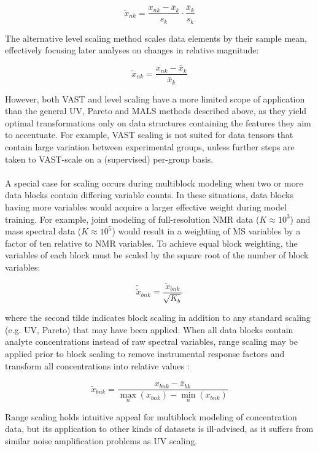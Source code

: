 \begin{doublespace}
\begin{equation}
\tilde{x}_{nk}
 = \frac{x_{nk} - \bar{x}_k}{s_k} \cdot
   \frac{\bar{x}_k}{s_k}
\end{equation}

The alternative level scaling method scales data elements by their sample mean,
effectively focusing later analyses on changes in relative magnitude:

\begin{equation}
\tilde{x}_{nk} = \frac{x_{nk} - \bar{x}_k}{\bar{x}_k}
\end{equation}

However, both VAST and level scaling have a more limited scope of
application than the general UV, Pareto and MALS methods described above, as
they yield optimal transformations only on data structures containing the
features they aim to accentuate. For example, VAST scaling is not suited for
data tensors that contain large variation between experimental groups, unless
further steps are taken to VAST-scale on a (supervised) per-group basis.
\\\\
A special case for scaling occurs during multiblock modeling when two or more
data blocks contain differing variable counts. In these situations, data blocks
having more variables would acquire a larger effective weight during model
training. For example, joint modeling of full-resolution \hnmr{} NMR data
($K \approx 10^3$) and mass spectral data ($K \approx 10^5$) would result in
a weighting of MS variables by a factor of ten relative to NMR variables. To
achieve equal block weighting, the variables of each block must be scaled by
the square root of the number of block variables:

\begin{equation}
\tilde{\tilde{x}}_{bnk} = \frac{\tilde{x}_{bnk}}{\sqrt{K_b}}
\end{equation}

where the second tilde indicates block scaling in addition to any standard
scaling (e.g. UV, Pareto) that may have been applied. When all data blocks
contain analyte concentrations instead of raw spectral variables, range
scaling may be applied prior to block scaling to remove instrumental response
factors and transform all concentrations into relative values
\cite{smilde:anchem2005}:

\begin{equation}
\tilde{x}_{bnk}
 = \frac{x_{bnk} - \bar{x}_{bk}}
        {\max_n(x_{bnk}) - \min_n(x_{bnk})}
\end{equation}

Range scaling holds intuitive appeal for multiblock modeling of concentration
data, but its application to other kinds of datasets is ill-advised, as it
suffers from similar noise amplification problems as UV scaling.
\end{doublespace}


